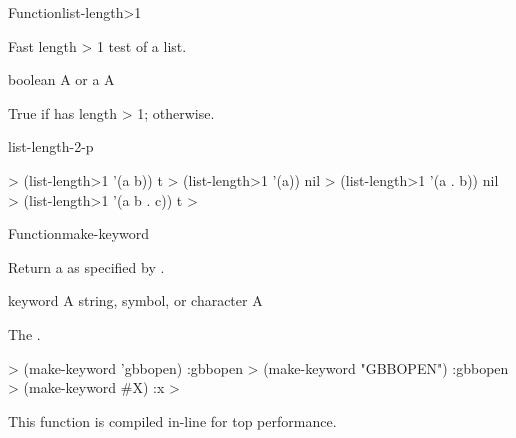 \documentclass[10pt,twoside,english,pdftex]{article}
\newcommand{\inline}{This function is compiled in-line for top performance.}
\begin{document}
\begin{functiondoc}{Function}{list-length>1}%
  {
    \returns{} }
%
%

\fnsyntax

\fnpurpose Fast length > 1 test of a list.

\fnpackage {}

\fnmodule {}

\fnargs
\begin{args}{boolean}
\arg[list] A  or a 
\arg[boolean] A 
\end{args}

\fnreturns True if  has length > 1; \nil{} otherwise.

\begin{alsos}{list-length-2-p}
\end{alsos}

\fnexamples
%
\W\supp
\begin{example}
  > (list-length>1 '(a b))
  t
  > (list-length>1 '(a))
  nil\goodpagebreak
  > (list-length>1 '(a . b))
  nil
  > (list-length>1 '(a b . c))
  t
  >
\end{example}

\end{functiondoc}


\begin{functiondoc}{Function}{make-keyword}{
    \returns{} } 
%
%
  
\fnsyntax

\fnpurpose Return a  as specified by .

\fnpackage {}

\fnmodule {}

\fnargs
\begin{args}{keyword}
\arg[x] A string, symbol, or character
\arg[keyword] A 
\end{args}

\fnreturns The .

\fnexamples
%
\W\supp
\begin{example}
  > (make-keyword 'gbbopen)
  :gbbopen
  > (make-keyword "GBBOPEN")
  :gbbopen
  > (make-keyword #\bkslash{}X)
  :x
  >
\end{example}

\fnnote \inline

\end{functiondoc}
\end{document}
